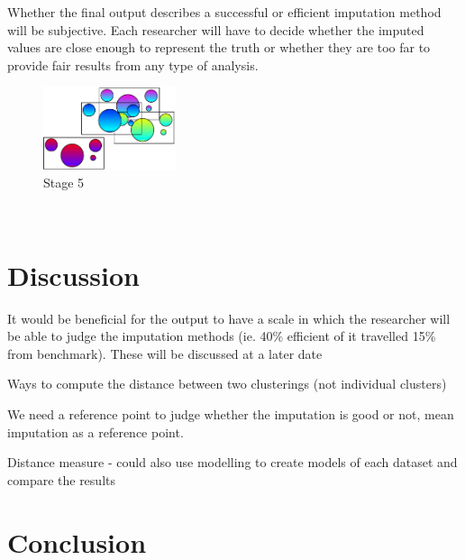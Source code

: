 \documentclass{IEEEconf}
\begin{document}
		Whether the final output describes a successful or efficient imputation method will be subjective. Each researcher will have to decide whether the imputed values are close enough to represent the truth or whether they are too far to provide fair results from any type of analysis. 
		\begin{figure}[!ht]
			\caption{Stage 5}
			\centering
			\includegraphics[width=0.35\textwidth]{stage5-2.pdf}
		\end{figure}
		\\

	\section{Discussion} %
	\label{sec:discussion}
		It would be beneficial for the output to have a scale in which the researcher will be able to judge the imputation methods (ie. 40\% efficient of it travelled 15\% from benchmark). These will be discussed at a later date
		
		Ways to compute the distance between two clusterings (not individual clusters) 
		
		We need a reference point to judge whether the imputation is good or not, mean imputation as a reference point.

		Distance measure - could also use modelling to create models of each dataset and compare the results 



	\section{Conclusion} %
	\label{sec:conclusion}
		



	
	
\end{document}
